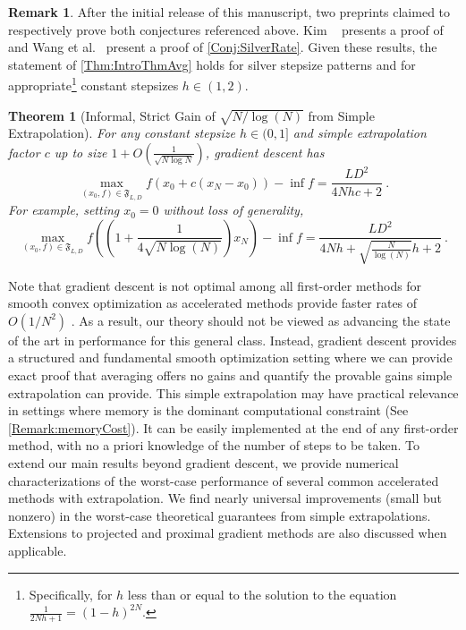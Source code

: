 \documentclass[11pt]{article}
\numberwithin{equation}{section}
\newtheorem{theorem}{Theorem}[section]
\theoremstyle{definition}
\newtheorem{remark}{Remark}
\theoremstyle{definition}
\theoremstyle{definition}
\newcommand{\1}{\mathbf{1}}
\begin{document}
\begin{remark} \label{Rem:SilverProven}
    After the initial release of this manuscript, two preprints claimed to respectively prove both conjectures referenced above. Kim ~\cite{Kim_ProofOfConstantStepGD} presents a proof of \cite[Conjecture 3.1]{FirstPEP} and Wang et al.~\cite{Wang_ProofOfConjecture} present a proof of \cref{Conj:SilverRate}. Given these results, the statement of \cref{Thm:IntroThmAvg} holds for silver stepsize patterns and for appropriate\footnote{Specifically, for $h$ less than or equal to the solution to the equation $\frac{1}{2Nh+1} = (1-h)^{2N}$.} constant stepsizes $h \in (1,2)$.
\end{remark}

\begin{theorem}[Informal, Strict Gain of $\sqrt{N/\log(N)}$ from Simple Extrapolation] \label{Thm:IntroThmExtrap}
    For any constant stepsize $h \in (0,1]$ and simple extrapolation factor $c$ up to size $1 + O\left(\frac{1}{\sqrt{N \log N}}\right)$, gradient descent has
    \begin{equation} \label{Eqn:IntroExtrapBoundGeneral}
        \max_{(x_0,f)\in \mathfrak{F}_{L,D}} f(x_0 + c(x_N-x_0)) - \inf f  = \frac{LD^2}{4Nhc+2} \ . 
    \end{equation}
    For example, setting $x_0=0$ without loss of generality,
    \begin{equation} \label{Eqn:IntroExtrapBoundSpec}
        \max_{(x_0,f)\in \mathfrak{F}_{L,D}} f\left(\left(1 + \frac{1}{4\sqrt{N\log(N)}}\right)x_N\right) - \inf f  = \frac{LD^2}{4Nh + \sqrt{\frac{N}{\log(N)}}h + 2} \ . 
    \end{equation}
\end{theorem}

Note that gradient descent is not optimal among all first-order methods for smooth convex optimization as accelerated methods provide faster rates of $O(1/N^2)$ \cite{OGM,Nesterov}. As a result, our theory should not be viewed as advancing the state of the art in performance for this general class. Instead, gradient descent provides a structured and fundamental smooth optimization setting where we can provide exact proof that averaging offers no gains and quantify the provable gains simple extrapolation can provide. This simple extrapolation may have practical relevance in settings where memory is the dominant computational constraint (See \cref{Remark:memoryCost}). It can be easily implemented at the end of any first-order method, with no a priori knowledge of the number of steps to be taken. To extend our main results beyond gradient descent, we provide numerical characterizations of the worst-case performance of several common accelerated methods with extrapolation. We find nearly universal improvements (small but nonzero) in the worst-case theoretical guarantees from simple extrapolations. Extensions to projected and proximal gradient methods are also discussed when applicable.
\end{document}
